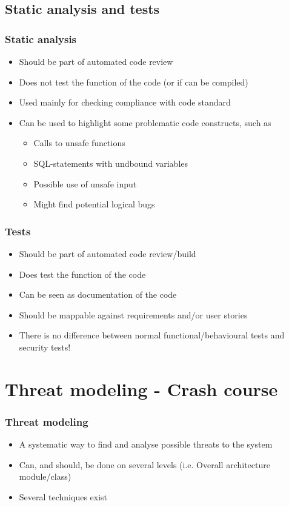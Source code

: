 \documentclass{beamer}
\begin{document}
\subsection{Static analysis and tests}
\begin{frame}
\frametitle{Static analysis}
\begin{itemize}
  \item Should be part of automated code review
  \item Does not test the function of the code (or if can be compiled)
  \item Used mainly for checking compliance with code standard
  \item Can be used to highlight some problematic code constructs, such as
  \begin{itemize}
    \item Calls to unsafe functions
    \item SQL-statements with undbound variables
    \item Possible use of unsafe input
    \item Might find potential logical bugs
  \end{itemize}
\end{itemize}
\end{frame}

\begin{frame}
\frametitle{Tests}
\begin{itemize}
  \item Should be part of automated code review/build
  \item Does test the function of the code
  \item Can be seen as documentation of the code
  \item Should be mappable against requirements and/or user stories
  \item There is no difference between normal functional/behavioural tests and security tests!
\end{itemize}
\end{frame}

\section{Threat modeling - Crash course}
\begin{frame}
\frametitle{Threat modeling}
\begin{itemize}
  \item A systematic way to find and analyse possible threats to the system
  \item Can, and should, be done on several levels (i.e. Overall architecture \textrightarrow module/class)
  \item Several techniques exist
\end{itemize}
\end{frame}
\end{document}
